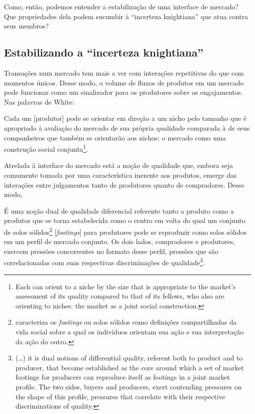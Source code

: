 \documentclass[a4paper, 12pt, openright, oneside, german, french, english, brazil]{abntex2}
\begin{document}
	Como, então, podemos entender a estabilização de uma interface de mercado? Que propriedades dela podem sucumbir à ``incerteza knightiana'' que atua contra seus membros?

	\subsection{Estabilizando a ``incerteza knightiana''}

	Transações num mercado tem mais a ver com interações repetitivas do que com momentos únicos. Desse modo, o volume de fluxos de produtos em um mercado pode funcionar como um sinalizador para os produtores sobre os engajamentos. Nas palavras de White:

	\begin{citacao}
		Cada um [produtor] pode se orientar em direção a um nicho pelo tamanho que é apropriado à avaliação do mercado de sua própria qualidade comparada à de seus companheiros que também se orientarão aos nichos: o mercado como uma construção social conjunta\footnote{Each can orient to a niche by the size that is appropriate to the market's assessment of its quality compared to that of its fellows, who also are orienting to niches: the market as a joint social construction.}. \cite[p. 10]{white2002markets}
	\end{citacao}

	Atrelada à interface do mercado está a noção de qualidade que, embora seja comumente tomada por uma característica inerente aos produtos, emerge das interações entre julgamentos tanto de produtores quanto de compradores. Desse modo,

	\begin{citacao}
		É uma noção dual de qualidade diferencial referente tanto a produto como a produtor que se torna estabelecida como o centro em volta do qual um conjunto de solos sólidos\footnote{ caracteriza os \textit{footings} ou solos sólidos como definições compartilhadas da vida social sobre a qual os indivíduos orientam sua ação e sua interpretação da ação do outro.} [\textit{footings}] para produtores pode se reproduzir como solos sólidos em um perfil de mercado conjunto. Os dois lados, compradores e produtores, exercem pressões concorrentes no formato desse perfil, pressões que são correlacionadas com suas respectivas discriminações de qualidade\footnote{(\dots) it is dual notions of differential quality, referent both to product and to producer, that become established as the core around which a set of market footings for producers can reproduce itself as footings in a joint market profile. The two sides, buyers and producers, exert contending pressures on the shape of this profile, pressures that correlate with their respective discriminations of quality.}. \cite[p. 10]{white2002markets}
	\end{citacao}
\end{document}
